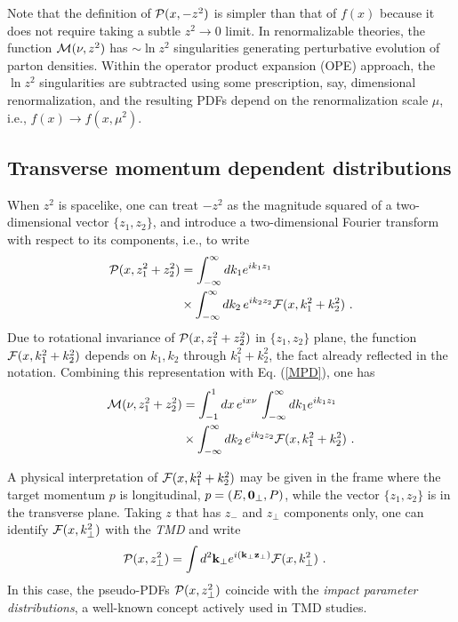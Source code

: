 \documentclass[aps,prd,twocolumn,showpacs,preprintnumbers,superscriptaddress,groupedaddress]{revtex4-1}
\newcommand{\nn}{\nonumber \\ }
\begin{document}
Note that  the definition of $ {\cal P} (x, -z^2) $ is simpler than  that of $f(x)$ because it 
 does not require taking  a subtle $z^2 \to 0$  limit.  
  In     renormalizable theories,    
  the function  $ {\cal M} (\nu, z^2)  $ 
 has  $\sim \ln z^2$  singularities 
generating  perturbative evolution of parton densities.  
Within the   operator product expansion
(OPE)  approach,  the $\ln z^2$  singularities
are subtracted using some prescription, say, dimensional renormalization,
and the resulting PDFs   depend on the renormalization scale $\mu$, i.e., 
$f(x) \to   f(x, \mu^2)$. 




  

 \subsection{Transverse momentum dependent
distributions}   


When $z^2$ is spacelike, one can treat  $-z^2$ 
as the magnitude squared of a two-dimensional  
 vector    $ \{z_1,z_2\}$,     and introduce a two-dimensional 
 Fourier transform 
with respect to its components, i.e.,  to write 
     \begin{align}
 {\cal P} (x,  z_1^2+z_2^2) 
&   = 
    \int_{-\infty}^\infty  {d k_1 } e^{i k_1 z_1} 
   \nn & \times  
    \int_{-\infty}^\infty  dk_2 \,e^{ik_2z_2} 
      {\cal F} (x, k_1^2+k_2^2)
 \   .
  \label{PTMD}
\end{align}  
Due to rotational invariance of ${\cal P} (x,  z_1^2+z_2^2) $
in $ \{z_1,z_2\}$  plane,
the function      ${\cal F} (x, k_1^2+k_2^2)$ depends 
on ${k_1,k_2}$  through $k_1^2+k_2^2$, the fact already reflected in the notation. 
Combining this representation with Eq. (\ref{MPD}), one has 
   \begin{align}
 {\cal M} (\nu,  z_1^2+z_2^2) 
&   =  \int_{-1}^1 dx 
 \, e^{i x \nu  } \, 
    \int_{-\infty}^\infty  {d k_1 } e^{i k_1 z_1} 
   \nn & \times  
    \int_{-\infty}^\infty  dk_2 \,e^{ik_2z_2} 
      {\cal F} (x, k_1^2+k_2^2)
 \   .
  \label{MTMD}
\end{align}  

A physical interpretation of  ${\cal F} (x, k_1^2+k_2^2)$
may be given in the frame  where  the target momentum $p$ is   longitudinal,
\mbox{$p= (E, {\bf 0}_\perp, P)$,}  while  the vector  
$\{z_1,z_2\} $  is in the transverse plane.   Taking $z$ that has 
 $z_-$ and $z_\perp$  components only,  one can identify   ${\cal F} (x, k_\perp^2)$
with  the  
{\it TMD }    and write 
    \begin{align}
 {\cal P} (x,  z_\perp^2) 
&   = 
    \int  d^2{\bf k}_\perp   e^{i ({\bf k}_\perp {\bf z}_\perp)} 
      {\cal F} (x, {k}_\perp^2)
 \   .
  \label{MTMD0}
\end{align}  
In this case, the pseudo-PDFs  $ {\cal P} (x,  z_\perp^2) $ coincide
with the  {\it impact parameter distributions}, a well-known   concept 
 actively
used in TMD studies.
\end{document}
